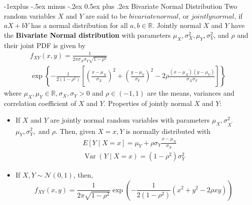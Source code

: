 \documentclass[10pt,landscape]{article}
\makeatletter
\renewcommand{\subsection}{\@startsection{subsection}{2}{0mm}%
                                {-1explus -.5ex minus -.2ex}%
                                {0.5ex plus .2ex}%
                                {\normalfont\normalsize\bfseries}}
\makeatother
\begin{document}
\begin{multicols*}{3}
	\subsection{Bivariate Normal Distribution}
	Two random variables $X$ and $Y$ are said to be $bivariate normal$, or $jointly normal$, if $a X+b Y$ has a normal distribution for all $a, b \in \mathbb{R}$. Jointly normal $X$ and $Y$ have the \textbf{Bivariate Normal distribution} with parameters $\mu_{X}, \sigma_{X}^{2}, \mu_{Y}, \sigma_{Y}^{2}$, and $\rho$ and their joint PDF is given by
	$$
	\begin{array}{l}
		f_{X Y}(x, y)=\frac{1}{2 \pi \sigma_{X} \sigma_{Y} \sqrt{1-\rho^{2}}}                                                                                                                                                                             \\
		\exp \left\{-\frac{1}{2\left(1-\rho^{2}\right)}\left[\left(\frac{x-\mu_{X}}{\sigma_{X}}\right)^{2}+\left(\frac{y-\mu_{Y}}{\sigma_{Y}}\right)^{2}-2 \rho \frac{\left(x-\mu_{X}\right)\left(y-\mu_{Y}\right)}{\sigma_{X} \sigma_{Y}}\right]\right\} 
	\end{array}
	$$
	where $\mu_{X}, \mu_{Y} \in \mathbb{R}, \sigma_{X}, \sigma_{Y}>0$ and $\rho \in(-1,1)$ are the means, variances and correlation coefficient of $X$ and $Y$. Properties of jointly normal $X$ and $Y$:
	\begin{itemize}
		\item If $X$ and $Y$ are jointly normal random variables with parameters $\mu_{X}, \sigma_{X^{\prime}}^{2}$ $\mu_{Y}, \sigma_{Y}^{2},$ and $\rho .$ Then, given $X=x, Y$ is normally distributed with
		      $$
		      \begin{array}{l}
		      	E[Y \mid X=x]=\mu_{Y}+\rho \sigma_{Y} \frac{x-\mu_{X}}{\sigma_{X}}    \\
		      	\operatorname{Var}(Y \mid X=x)=\left(1-\rho^{2}\right) \sigma_{Y}^{2} 
		      \end{array}
		      $$
		\item If $X, Y \sim \mathcal{N}(0 ,1)$, then,
		      $$  
		      f_{XY}(x,y) = \frac{1}{2 \pi \sqrt{1-\rho^2}} \exp{\left(-\frac{1}{2 (1-\rho^2)} (x^2+y^2-2 \rho xy)\right)}
		      $$
	\end{itemize}
									

\end{multicols*}
\end{document}
